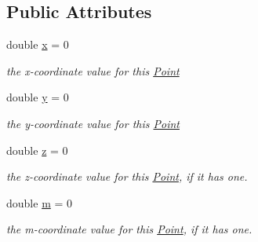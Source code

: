 \subsection*{Public Attributes}
\begin{DoxyCompactItemize}
\item 
\hypertarget{classsimo_1_1shapes_1_1_point_aa4abc96b03859b69bb1af19099a9799f}{double \hyperlink{classsimo_1_1shapes_1_1_point_aa4abc96b03859b69bb1af19099a9799f}{x} = 0}\label{classsimo_1_1shapes_1_1_point_aa4abc96b03859b69bb1af19099a9799f}

\begin{DoxyCompactList}\small\item\em the x-\/coordinate value for this \hyperlink{classsimo_1_1shapes_1_1_point}{Point} \end{DoxyCompactList}\item 
\hypertarget{classsimo_1_1shapes_1_1_point_a370ca8d7d03517735a9792cca7cbb05e}{double \hyperlink{classsimo_1_1shapes_1_1_point_a370ca8d7d03517735a9792cca7cbb05e}{y} = 0}\label{classsimo_1_1shapes_1_1_point_a370ca8d7d03517735a9792cca7cbb05e}

\begin{DoxyCompactList}\small\item\em the y-\/coordinate value for this \hyperlink{classsimo_1_1shapes_1_1_point}{Point} \end{DoxyCompactList}\item 
\hypertarget{classsimo_1_1shapes_1_1_point_a4498c1e84bb25e32cd75d41a74d48169}{double \hyperlink{classsimo_1_1shapes_1_1_point_a4498c1e84bb25e32cd75d41a74d48169}{z} = 0}\label{classsimo_1_1shapes_1_1_point_a4498c1e84bb25e32cd75d41a74d48169}

\begin{DoxyCompactList}\small\item\em the z-\/coordinate value for this \hyperlink{classsimo_1_1shapes_1_1_point}{Point}, if it has one. \end{DoxyCompactList}\item 
\hypertarget{classsimo_1_1shapes_1_1_point_aced73731924b13762c7b6446bf3ad9a5}{double \hyperlink{classsimo_1_1shapes_1_1_point_aced73731924b13762c7b6446bf3ad9a5}{m} = 0}\label{classsimo_1_1shapes_1_1_point_aced73731924b13762c7b6446bf3ad9a5}

\begin{DoxyCompactList}\small\item\em the m-\/coordinate value for this \hyperlink{classsimo_1_1shapes_1_1_point}{Point}, if it has one. \end{DoxyCompactList}\end{DoxyCompactItemize}


